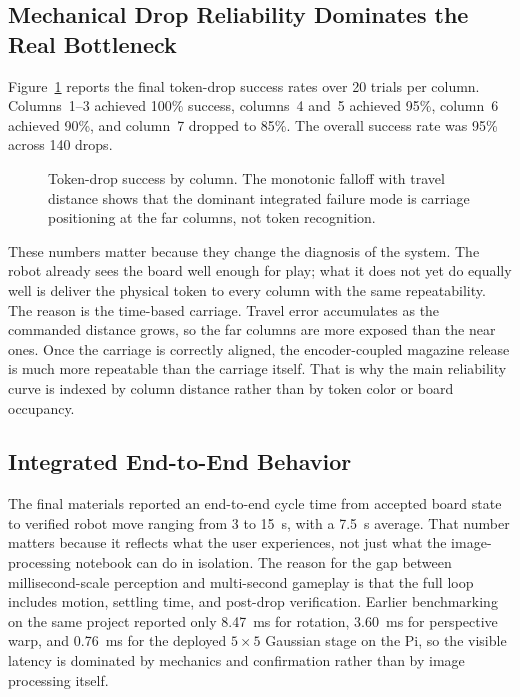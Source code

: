 \documentclass[conference]{IEEEtran}
\begin{document}
\subsection{Mechanical Drop Reliability Dominates the Real Bottleneck}
Figure~\ref{fig:drops} reports the final token-drop success rates over 20 trials per column. Columns~1--3 achieved 100\% success, columns~4 and~5 achieved 95\%, column~6 achieved 90\%, and column~7 dropped to 85\%. The overall success rate was 95\% across 140 drops.

\begin{figure}[t]
\centering
{}
\caption{Token-drop success by column. The monotonic falloff with travel distance shows that the dominant integrated failure mode is carriage positioning at the far columns, not token recognition.}
\label{fig:drops}
\end{figure}

These numbers matter because they change the diagnosis of the system. The robot already sees the board well enough for play; what it does not yet do equally well is deliver the physical token to every column with the same repeatability. The reason is the time-based carriage. Travel error accumulates as the commanded distance grows, so the far columns are more exposed than the near ones. Once the carriage is correctly aligned, the encoder-coupled magazine release is much more repeatable than the carriage itself. That is why the main reliability curve is indexed by column distance rather than by token color or board occupancy.

\subsection{Integrated End-to-End Behavior}
The final materials reported an end-to-end cycle time from accepted board state to verified robot move ranging from 3 to 15~s, with a 7.5~s average. That number matters because it reflects what the user experiences, not just what the image-processing notebook can do in isolation. The reason for the gap between millisecond-scale perception and multi-second gameplay is that the full loop includes motion, settling time, and post-drop verification. Earlier benchmarking on the same project reported only 8.47~ms for rotation, 3.60~ms for perspective warp, and 0.76~ms for the deployed $5\times5$ Gaussian stage on the Pi, so the visible latency is dominated by mechanics and confirmation rather than by image processing itself.
\end{document}
